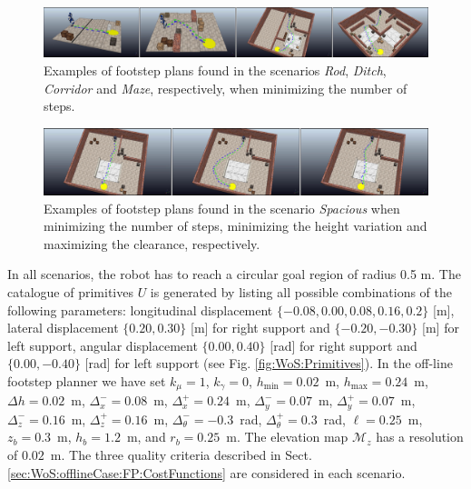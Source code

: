 \begin{figure}
    \centering
    \includegraphics[width=\textwidth]{figures/ExampleResults.jpeg}
    \caption{Examples of footstep plans found in the scenarios \textit{Rod}, \textit{Ditch}, \textit{Corridor} and \textit{Maze}, respectively, when minimizing the number of steps.}
    \label{fig:WoS:ExampleResults}
\end{figure}
\begin{figure}
    \centering
    \includegraphics[width=\textwidth]{figures/ExampleResultsCompare.jpeg}
    \caption{Examples of footstep plans found in the scenario \textit{Spacious} when minimizing the number of steps, minimizing the height variation and maximizing the clearance, respectively.}
    \label{fig:WoS:ExampleResultsCompare}
\end{figure}

In all scenarios, the robot has to reach a circular goal region of radius 0.5 m.
The catalogue of primitives $U$ is generated by listing all possible
combinations of the following parameters: longitudinal displacement
$\{-0.08,0.00,0.08,0.16,0.2\}$ [m], lateral displacement $\{0.20,0.30\}$ [m]
for right support and $\{-0.20,-0.30\}$ [m] for left support, angular
displacement $\{0.00,0.40\}$ [rad] for right support and $\{0.00,-0.40\}$ [rad]
for left support (see Fig. \ref{fig:WoS:Primitives}).
In the off-line footstep planner we have set
$k_{\mu} = 1$, $k_{\gamma} = 0$, $h_{\min} = 0.02$~m, $h_{\max} = 0.24$~m,
$\Delta h = 0.02$~m, $\Delta_x^- = 0.08$~m, $\Delta_x^+ = 0.24$~m,
$\Delta_y^-=0.07$~m, $\Delta_y^+=0.07$~m, $\Delta_z^-=0.16$~m,
$\Delta_z^+=0.16$~m, $\Delta_\theta^-=-0.3$~rad, $\Delta_\theta^+=0.3$~rad,
$\ell = 0.25$~m, $z_b=0.3$~m, $h_b=1.2$~m, and $r_b=0.25$~m.
The elevation map $\mathcal{M}_z$ has a resolution of $0.02$~m.
The three quality criteria described in
Sect. \ref{sec:WoS:offlineCase:FP:CostFunctions} are considered in each scenario.


